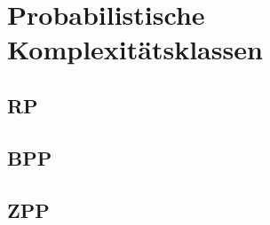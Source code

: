\section{Probabilistische Komplexitätsklassen}


\subsection{RP}


\subsection{BPP}


\subsection{ZPP}